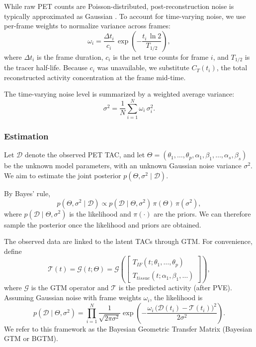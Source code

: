 While raw PET counts are Poisson-distributed, post-reconstruction noise is typically approximated as Gaussian \cite{TODO}.
To account for time-varying noise, we use per-frame weights to normalize variance across frames:
\begin{equation}
	\omega_{i} = \frac{\Delta t_i}{c_i}\,\exp\!\left(-\frac{t_{i}\,\ln 2}{T_{1/2}}\right),
\end{equation}
where \(\Delta t_i\) is the frame duration, \(c_i\) is the net true counts for frame \(i\), and \(T_{1/2}\) is the tracer half-life.
Because \(c_i\) was unavailable, we substitute \(C_T(t_i)\), the total reconstructed activity concentration at the frame mid-time.

The time-varying noise level is summarized by a weighted average variance:
\begin{equation}
	\sigma^2 = \frac{1}{N} \sum_{i=1}^{N} \omega_i\,\sigma_i^2.
\end{equation}

\subsubsection{Estimation}
Let \(\mathcal{D}\) denote the observed PET TAC, and let \( \Theta = (\theta_{1}, \dots,\theta_{p}, \alpha_{1}, \beta_{1}, \dots, \alpha_{s}, \beta_{s}) \) be the unknown model parameters, with an unknown Gaussian noise variance \(\sigma^2\).
We aim to estimate the joint posterior \(p(\Theta,\sigma^2\mid \mathcal{D})\).

By Bayes’ rule,
\begin{equation}
	p(\Theta,\sigma^2 \mid \mathcal{D}) \propto p(\mathcal{D} \mid \Theta,\sigma^2)\,\pi( \Theta )\,\pi( \sigma^2),
\end{equation}
where \(p(\mathcal{D} \mid \Theta,\sigma^2)\) is the likelihood and \(\pi(\cdot)\) are the priors.
We can therefore sample the posterior once the likelihood and priors are obtained.

The observed data are linked to the latent TACs through GTM.
For convenience, define
\begin{equation}
	\mathcal{T}(t) = \mathcal{G}(t;\Theta) =
	\mathcal{G}\!\left(
	\begin{bmatrix}
			T_{IF}(t;\theta_{1}, \dots, \theta_{p}) \\
			T_{tissue}(t;\alpha_{1}, \beta_{1}, \dots)
		\end{bmatrix}\right),
\end{equation}
where \(\mathcal{G}\) is the GTM operator and \(\mathcal{T}\) is the predicted activity (after PVE).
Assuming Gaussian noise with frame weights \(\omega_i\), the likelihood is
\begin{equation}
	p(\mathcal{D} \mid \Theta,\sigma^2) = \prod_{i=1}^N \frac{1}{\sqrt{2\pi \sigma^2}} \exp\!\left( -\frac{\omega_i\,\bigl(\mathcal{D}(t_i) - \mathcal{T}(t_i)\bigr)^2}{2\sigma^2} \right).
\end{equation}
We refer to this framework as the Bayesian Geometric Transfer Matrix (Bayesian GTM or BGTM).

